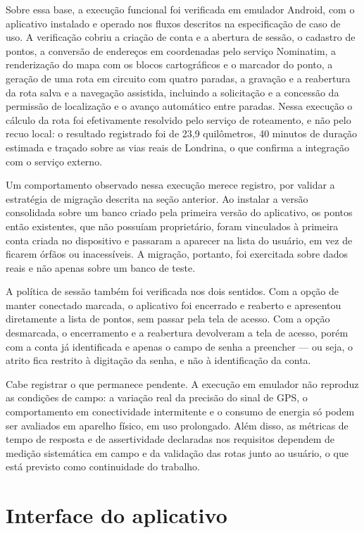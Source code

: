 Sobre essa base, a execução funcional foi verificada em emulador Android, com o aplicativo instalado e operado nos fluxos descritos na especificação de caso de uso. A verificação cobriu a criação de conta e a abertura de sessão, o cadastro de pontos, a conversão de endereços em coordenadas pelo serviço Nominatim, a renderização do mapa com os blocos cartográficos e o marcador do ponto, a geração de uma rota em circuito com quatro paradas, a gravação e a reabertura da rota salva e a navegação assistida, incluindo a solicitação e a concessão da permissão de localização e o avanço automático entre paradas. Nessa execução o cálculo da rota foi efetivamente resolvido pelo serviço de roteamento, e não pelo recuo local: o resultado registrado foi de 23,9 quilômetros, 40 minutos de duração estimada e traçado sobre as vias reais de Londrina, o que confirma a integração com o serviço externo.

Um comportamento observado nessa execução merece registro, por validar a estratégia de migração descrita na seção anterior. Ao instalar a versão consolidada sobre um banco criado pela primeira versão do aplicativo, os pontos então existentes, que não possuíam proprietário, foram vinculados à primeira conta criada no dispositivo e passaram a aparecer na lista do usuário, em vez de ficarem órfãos ou inacessíveis. A migração, portanto, foi exercitada sobre dados reais e não apenas sobre um banco de teste.

A política de sessão também foi verificada nos dois sentidos. Com a opção de manter conectado marcada, o aplicativo foi encerrado e reaberto e apresentou diretamente a lista de pontos, sem passar pela tela de acesso. Com a opção desmarcada, o encerramento e a reabertura devolveram a tela de acesso, porém com a conta já identificada e apenas o campo de senha a preencher — ou seja, o atrito fica restrito à digitação da senha, e não à identificação da conta.

Cabe registrar o que permanece pendente. A execução em emulador não reproduz as condições de campo: a variação real da precisão do sinal de GPS, o comportamento em conectividade intermitente e o consumo de energia só podem ser avaliados em aparelho físico, em uso prolongado. Além disso, as métricas de tempo de resposta e de assertividade declaradas nos requisitos dependem de medição sistemática em campo e da validação das rotas junto ao usuário, o que está previsto como continuidade do trabalho.

\section{Interface do aplicativo}

